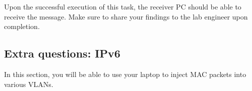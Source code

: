 \documentclass[pdftex,12pt,a4paper]{article}
\begin{document}
            Upon the successful execution of this task, the receiver PC should
            be able to receive the message. Make sure to share your findings to
            the lab engineer upon completion.


        \subsection{Extra questions: IPv6}

            In this section, you will be able to use your laptop to inject MAC
            packets into various VLANs.
\end{document}
